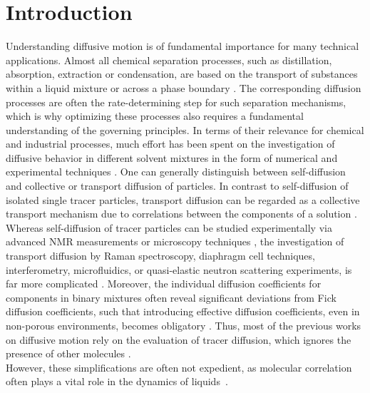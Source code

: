 \documentclass[aip,jcp,reprint]{revtex4-1}
\begin{document}
\section{Introduction}
Understanding diffusive motion is of fundamental importance for many technical applications.
Almost all chemical separation processes, such as distillation, absorption, extraction or condensation, are based on the transport of substances within a liquid mixture or across a phase boundary \cite{seader06a,wankat22a}.
The corresponding diffusion processes are often the rate-determining step for such separation mechanisms, which is why optimizing these processes also requires a fundamental understanding of the governing principles. In terms of their relevance for chemical and industrial processes, much effort has been spent on the investigation of diffusive behavior in different solvent mixtures \cite{maxwell67a,bird04a,newman12a, groot13a} in the form of numerical and experimental techniques \cite{kincaid83a,derlacki85a,vink85a,trullas93a,vergara01a, keffer05a,rehfeldt07a,krishna08a,krishna09a,rehfeldt10a,liu11a,moggridge12a,liu13a,parez13a,zhu15a,bardow15a,guevara16a,janzen17a}.
One can generally distinguish between self-diffusion and collective or transport diffusion of particles.
In contrast to self-diffusion of isolated single tracer particles,  transport diffusion can be regarded as a collective transport mechanism due to correlations between the components of a solution \cite{taylor93a,bird04a,newman12a,groot13a,liu13a,guevara16a,janzen17a}.\\
Whereas self-diffusion of tracer particles can be studied experimentally via advanced NMR measurements or microscopy techniques \cite{kashyap11a},  the investigation of transport diffusion by  Raman
spectroscopy, diaphragm cell techniques, interferometry,
microfluidics, or quasi-elastic neutron scattering experiments, is far more complicated \cite{liu13a,taylor93a}.
Moreover, the individual diffusion coefficients for components in binary mixtures often reveal significant deviations from Fick diffusion coefficients, such that introducing effective diffusion coefficients, even in non-porous environments, becomes obligatory \cite{taylor93a}.  
Thus, most of the previous works on diffusive motion rely on the evaluation of tracer diffusion, which ignores the presence of other molecules  \cite{liu13a}.  \\
However, these simplifications are often not expedient, as molecular correlation often plays a vital role in the dynamics of liquids~\cite{jones22a, bergstrom23a}. 
\end{document}
